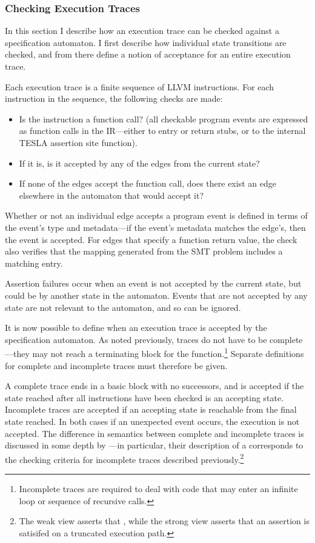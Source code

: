 \subsubsection{Checking Execution Traces}

In this section I describe how an execution trace can be checked against a
specification automaton. I first describe how individual state transitions are
checked, and from there define a notion of acceptance for an entire execution
trace.

Each execution trace is a finite sequence of LLVM instructions. For each
instruction in the sequence, the following checks are made:
\begin{itemize}
  \item Is the instruction a function call? (all checkable program events are
    expressed as function calls in the IR---either to entry or return stubs, or
    to the internal TESLA assertion site function).
  \item If it is, is it accepted by any of the edges from the current state?
  \item If none of the edges accept the function call, does there exist an edge
    elsewhere in the automaton that would accept it?
\end{itemize}

Whether or not an individual edge accepts a program event is defined in terms of
the event's type and metadata---if the event's metadata matches the edge's, then
the event is accepted. For edges that specify a function return value, the check
also verifies that the mapping generated from the SMT problem includes a
matching entry.

Assertion failures occur when an event is not accepted by the current state, but
could be by another state in the automaton. Events that are not accepted by any
state are not relevant to the automaton, and so can be ignored.

It is now possible to define when an execution trace is accepted by the
specification automaton. As noted previously, traces do not have to be
complete---they may not reach a terminating block for the
function.\footnote{Incomplete traces are required to deal with code that may
enter an infinite loop or sequence of recursive calls.} Separate definitions for
complete and incomplete traces must therefore be given.

A complete trace ends in a basic block with no successors, and is accepted if
the state reached after all instructions have been checked is an accepting
state. Incomplete traces are accepted if an accepting state is reachable from
the final state reached. In both cases if an unexpected event occurs, the
execution is not accepted. The difference in semantics between complete and
incomplete traces is discussed in some depth by
\textcite{eisner_reasoning_2003}---in particular, their description of a
 corresponds to the checking criteria for incomplete traces
described previously.\footnote{The weak view asserts that
, while the
strong view asserts that an assertion is  satisifed on a
truncated execution path.}

